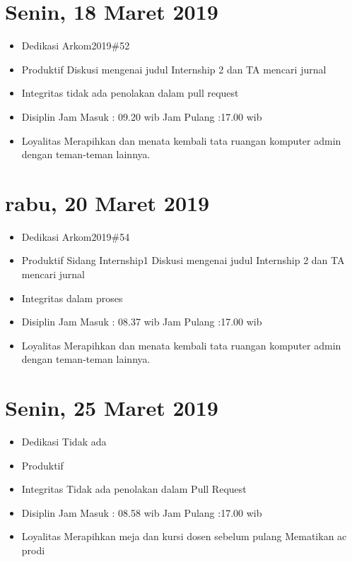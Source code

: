 \section{Senin, 18 Maret 2019}
\begin{itemize}
\item Dedikasi
\subitem Arkom2019\#52
\item Produktif
  \subitem Diskusi mengenai judul Internship 2 dan TA
  \subitem mencari jurnal
\item Integritas
  \subitem tidak ada penolakan dalam pull request
\item Disiplin
  \subitem Jam Masuk : 09.20 wib
  \subitem Jam Pulang :17.00 wib
\item Loyalitas
  \subitem Merapihkan dan menata kembali tata ruangan komputer admin dengan teman-teman lainnya.
\end{itemize}

\section{rabu, 20 Maret 2019}
\begin{itemize}
\item Dedikasi
\subitem Arkom2019\#54
\item Produktif
\subitem Sidang Internship1
  \subitem Diskusi mengenai judul Internship 2 dan TA
  \subitem mencari jurnal
\item Integritas
  \subitem dalam proses
\item Disiplin
  \subitem Jam Masuk : 08.37 wib
  \subitem Jam Pulang :17.00 wib
\item Loyalitas
  \subitem Merapihkan dan menata kembali tata ruangan komputer admin dengan teman-teman lainnya.
\end{itemize}

\section{Senin, 25 Maret 2019}
\begin{itemize}
\item Dedikasi
\subitem Tidak ada
\item Produktif
  \subitem 
  \subitem
\item Integritas
  \subitem Tidak ada penolakan dalam Pull Request
\item Disiplin
  \subitem Jam Masuk : 08.58 wib
  \subitem Jam Pulang :17.00 wib
\item Loyalitas
  \subitem Merapihkan meja dan kursi dosen sebelum pulang
  \subitem Mematikan ac prodi
\end{itemize}

